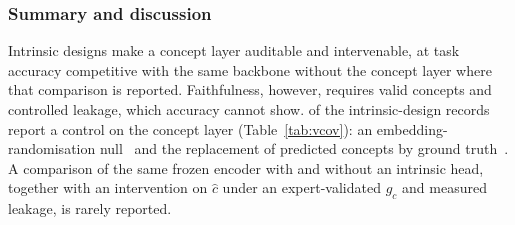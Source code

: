 \subsubsection{Summary and discussion}

Intrinsic designs make a concept layer auditable and intervenable, at task accuracy competitive with
the same backbone without the concept layer where that comparison is reported. Faithfulness, however,
requires valid concepts and controlled leakage, which accuracy cannot show. \Vintrany{} of the
\Vintrn{} intrinsic-design records report a control on the concept layer (Table~\ref{tab:vcov}): an
embedding-randomisation null~\cite{zhang2026regionfm} and the replacement of predicted concepts by
ground truth~\cite{patricio2025twostep}. A comparison of the same frozen encoder with and without an
intrinsic head, together with an intervention on $\hat c$ under an expert-validated $g_c$ and measured
leakage, is rarely reported.

